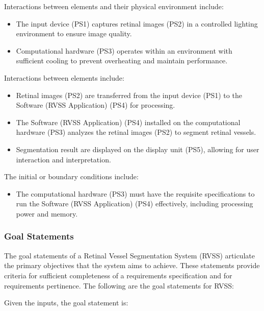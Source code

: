 \documentclass[12pt]{article}
\begin{document}
Interactions between elements and their physical environment include:
\begin{itemize}

\item The input device (PS1) captures retinal images (PS2) in a controlled lighting environment to ensure image quality.

\item Computational hardware (PS3) operates within an environment with sufficient cooling to prevent overheating and maintain performance.

\end{itemize}

Interactions between elements include:
\begin{itemize}

\item Retinal images (PS2) are transferred from the input device (PS1) to the Software (RVSS Application) (PS4) for processing.

\item The Software (RVSS Application) (PS4) installed on the computational hardware (PS3) analyzes the retinal images (PS2) to segment retinal vessels.

\item Segmentation result are displayed on the display unit (PS5), allowing for user interaction and interpretation.
\end{itemize}

The initial or boundary conditions include:
\begin{itemize}

\item The computational hardware (PS3) must have the requisite specifications to run the Software (RVSS Application) (PS4) effectively, including processing power and memory.
\end{itemize}

\subsubsection{Goal Statements}
The goal statements of a Retinal Vessel Segmentation System (RVSS) articulate the primary objectives that the system aims to achieve. These statements provide criteria for sufficient completeness of a requirements specification and for requirements pertinence. 
The following are the goal statements for RVSS:

\noindent Given the inputs, the goal statement is:
\end{document}
